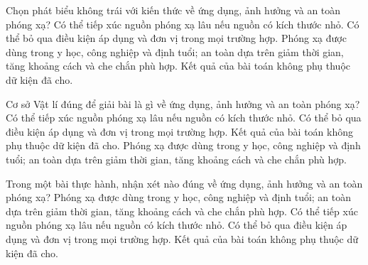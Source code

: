 \begin{ex}
Chọn phát biểu không trái với kiến thức về ứng dụng, ảnh hưởng và an toàn phóng xạ?
\choice
{Có thể tiếp xúc nguồn phóng xạ lâu nếu nguồn có kích thước nhỏ.}
{Có thể bỏ qua điều kiện áp dụng và đơn vị trong mọi trường hợp.}
{\True Phóng xạ được dùng trong y học, công nghiệp và định tuổi; an toàn dựa trên giảm thời gian, tăng khoảng cách và che chắn phù hợp.}
{Kết quả của bài toán không phụ thuộc dữ kiện đã cho.}
\end{ex}

\begin{ex}
Cơ sở Vật lí đúng để giải bài là gì về ứng dụng, ảnh hưởng và an toàn phóng xạ?
\choice
{Có thể tiếp xúc nguồn phóng xạ lâu nếu nguồn có kích thước nhỏ.}
{Có thể bỏ qua điều kiện áp dụng và đơn vị trong mọi trường hợp.}
{Kết quả của bài toán không phụ thuộc dữ kiện đã cho.}
{\True Phóng xạ được dùng trong y học, công nghiệp và định tuổi; an toàn dựa trên giảm thời gian, tăng khoảng cách và che chắn phù hợp.}
\end{ex}

\begin{ex}
Trong một bài thực hành, nhận xét nào đúng về ứng dụng, ảnh hưởng và an toàn phóng xạ?
\choice
{\True Phóng xạ được dùng trong y học, công nghiệp và định tuổi; an toàn dựa trên giảm thời gian, tăng khoảng cách và che chắn phù hợp.}
{Có thể tiếp xúc nguồn phóng xạ lâu nếu nguồn có kích thước nhỏ.}
{Có thể bỏ qua điều kiện áp dụng và đơn vị trong mọi trường hợp.}
{Kết quả của bài toán không phụ thuộc dữ kiện đã cho.}
\end{ex}

